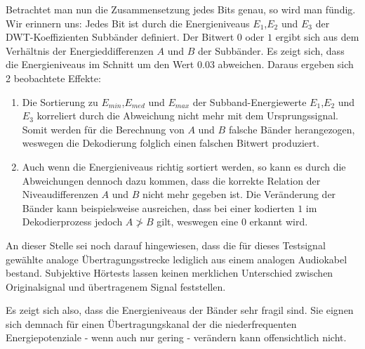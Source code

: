 Betrachtet man nun die Zusammensetzung jedes Bits genau, so wird man fündig. Wir erinnern uns: Jedes Bit ist durch die Energieniveaus ${E}_{1}$,${E}_{2}$ und ${E}_{3}$ der DWT-Koeffizienten Subbänder definiert. Der Bitwert $0$ oder $1$ ergibt sich aus dem Verhältnis der Energieddifferenzen $A$ und $B$ der Subbänder. Es zeigt sich, dass die Energieniveaus im Schnitt um den Wert $0.03$ abweichen. Daraus ergeben sich 2 beobachtete Effekte:

\begin{enumerate}
		
\item Die Sortierung zu ${E}_{min}$,${E}_{med}$ und ${E}_{max}$ der Subband-Energiewerte ${E}_{1}$,${E}_{2}$ und ${E}_{3}$ korreliert durch die Abweichung nicht mehr mit dem Ursprungssignal. Somit werden für die Berechnung von $A$ und $B$ falsche Bänder herangezogen, weswegen die Dekodierung folglich einen falschen Bitwert produziert. 
	
\item Auch wenn die Energieniveaus richtig sortiert werden, so kann es durch die Abweichungen dennoch dazu kommen, dass die korrekte Relation der Niveaudifferenzen $A$ und $B$ nicht mehr gegeben ist. Die Veränderung der Bänder kann beispielsweise ausreichen, dass bei einer kodierten $1$ im Dekodierprozess jedoch $A \ngtr B$ gilt, weswegen eine $0$ erkannt wird.
	
\end{enumerate}

An dieser Stelle sei noch darauf hingewiesen, dass die für dieses Testsignal gewählte analoge Übertragungsstrecke lediglich aus einem analogen Audiokabel bestand. Subjektive Hörtests lassen keinen merklichen Unterschied zwischen Originalsignal und übertragenem Signal feststellen. 

Es zeigt sich also, dass die Energieniveaus der Bänder sehr fragil sind. Sie eignen sich demnach für einen Übertragungskanal der die niederfrequenten Energiepotenziale - wenn auch nur gering - verändern kann offensichtlich nicht. 